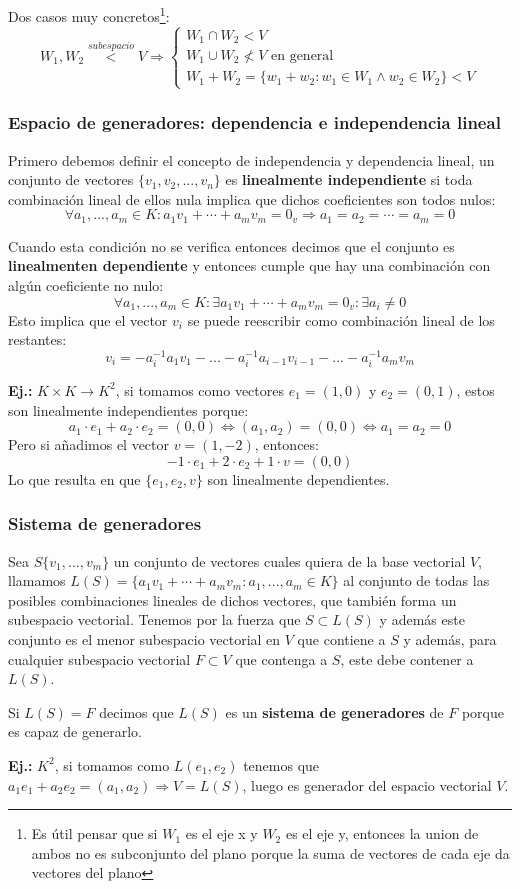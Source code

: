 \documentclass[10pt,a4paper,openright]{book}
\begin{document}
Dos casos muy concretos\footnote{Es útil pensar que si $W_1$ es el eje x y $W_2$ es el eje y, entonces la union de ambos no es subconjunto del plano porque la suma de vectores de cada eje da vectores del plano}:
$$W_1,W_2 \stackrel{subespacio}{<} V\Rightarrow \begin{cases}
W_1\cap W_2< V \\
W_1\cup W_2\nless V \mbox{ en general} \\
W_1+W_2=\{w_1+w_2: w_1\in W_1\wedge w_2\in W_2\}< V
\end{cases}$$

\subsubsection*{Espacio de generadores: dependencia e independencia lineal}
Primero debemos definir el concepto de independencia y dependencia lineal, un conjunto de vectores $\{v_1, v_2, ..., v_n\}$ es \textbf{linealmente independiente} si toda combinación lineal de ellos nula implica que dichos coeficientes son todos nulos:
$$\forall a_1, ..., a_m\in K: a_1v_1+\cdots +a_mv_m=0_v\Rightarrow a_1=a_2=\cdots =a_m=0$$

Cuando esta condición no se verifica entonces decimos que el conjunto es \textbf{linealmenten dependiente} y entonces cumple que hay una combinación con algún coeficiente no nulo:
$$\forall a_1, ..., a_m\in K: \exists a_1v_1+\cdots +a_mv_m=0_v: \exists a_i\neq 0$$
Esto implica que el vector $v_i$ se puede reescribir como combinación lineal de los restantes:
$$v_i=-a_i^{-1}a_1v_1-...-a_i^{-1}a_{i-1}v_{i-1}-...-a_i^{-1}a_mv_m$$

\textbf{Ej.:} $K\times K\rightarrow K^2$, si tomamos como vectores $e_1=(1,0)$ y $e_2=(0,1)$, estos son linealmente independientes porque:
$$a_1\cdot e_1+a_2\cdot e_2=(0,0)\Leftrightarrow (a_1,a_2)=(0,0)\Leftrightarrow a_1=a_2=0$$
Pero si añadimos el vector $v=(1,-2)$, entonces:
$$-1\cdot e_1+ 2\cdot e_2+ 1\cdot v=(0,0)$$
Lo que resulta en que $\{e_1, e_2, v\}$ son linealmente dependientes.

\subsubsection*{Sistema de generadores}
Sea $S\{v_1, ..., v_m\}$ un conjunto de vectores cuales quiera de la base vectorial $V$, llamamos $L(S)=\{a_1v_1+\cdots + a_mv_m: a_1, ..., a_m\in K\}$ al conjunto de todas las posibles combinaciones lineales de dichos vectores, que también forma un subespacio vectorial. Tenemos por la fuerza que $S\subset L(S)$ y además este conjunto es el menor subespacio vectorial en $V$ que contiene a $S$ y además, para cualquier subespacio vectorial $F\subset V$ que contenga a $S$, este debe contener a $L(S)$.\par
Si $L(S)=F$ decimos que $L(S)$ es un \textbf{sistema de generadores} de $F$ porque es capaz de generarlo.\par
\textbf{Ej.:} $K^2$, si tomamos como $L(e_1,e_2)$ tenemos que $a_1e_1+a_2e_2=(a_1, a_2)\Rightarrow V=L(S)$, luego es generador del espacio vectorial $V$.
\end{document}
